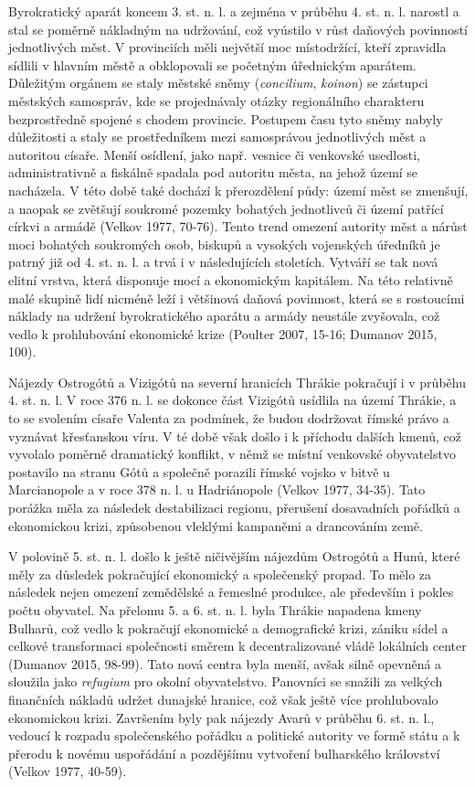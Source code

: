 Byrokratický aparát koncem 3. st. n. l. a zejména v průběhu 4. st. n. l. narostl a stal se poměrně nákladným na udržování, což vyústilo v růst daňových povinností jednotlivých měst. V provinciích měli největší moc místodržící, kteří zpravidla sídlili v hlavním městě a obklopovali se početným úřednickým aparátem. Důležitým orgánem se staly městské sněmy ({\em concilium}, {\em koinon}) se zástupci městských samospráv, kde se projednávaly otázky regionálního charakteru bezprostředně spojené s chodem provincie. Postupem času tyto sněmy nabyly důležitosti a staly se prostředníkem mezi samosprávou jednotlivých měst a autoritou císaře. Menší osídlení, jako např. vesnice či venkovské usedlosti, administrativně a fiskálně spadala pod autoritu města, na jehož území se nacházela. V této době také dochází k přerozdělení půdy: území měst se zmenšují, a naopak se zvětšují soukromé pozemky bohatých jednotlivců či území patřící církvi a armádě (Velkov 1977, 70-76). Tento trend omezení autority měst a nárůst moci bohatých soukromých osob, biskupů a vysokých vojenských úředníků je patrný již od 4. st. n. l. a trvá i v následujících stoletích. Vytváří se tak nová elitní vrstva, která disponuje mocí a ekonomickým kapitálem. Na této relativně malé skupině lidí nicméně leží i většinová daňová povinnost, která se s rostoucími náklady na udržení byrokratického aparátu a armády neustále zvyšovala, což vedlo k prohlubování ekonomické krize (Poulter 2007, 15-16; Dumanov 2015, 100).

Nájezdy Ostrogótů a Vizigótů na severní hranicích Thrákie pokračují i v průběhu 4. st. n. l. V roce 376 n. l. se dokonce část Vizigótů usídlila na území Thrákie, a to se svolením císaře Valenta za podmínek, že budou dodržovat římské právo a vyznávat křesťanskou víru. V té době však došlo i k příchodu dalších kmenů, což vyvolalo poměrně dramatický konflikt, v němž se místní venkovské obyvatelstvo postavilo na stranu Gótů a společně porazili římské vojsko v bitvě u Marcianopole a v roce 378 n. l. u Hadriánopole (Velkov 1977, 34-35). Tato porážka měla za následek destabilizaci regionu, přerušení dosavadních pořádků a ekonomickou krizi, způsobenou vleklými kampaněmi a drancováním země.

V polovině 5. st. n. l. došlo k ještě ničivějším nájezdům Ostrogótů a Hunů, které měly za důsledek pokračující ekonomický a společenský propad. To mělo za následek nejen omezení zemědělské a řemeslné produkce, ale především i pokles počtu obyvatel. Na přelomu 5. a 6. st. n. l. byla Thrákie napadena kmeny Bulharů, což vedlo k pokračují ekonomické a demografické krizi, zániku sídel a celkové transformaci společnosti směrem k decentralizované vládě lokálních center (Dumanov 2015, 98-99). Tato nová centra byla menší, avšak silně opevněná a sloužila jako {\em refugium} pro okolní obyvatelstvo. Panovníci se snažili za velkých finančních nákladů udržet dunajské hranice, což však ještě více prohlubovalo ekonomickou krizi. Završením byly pak nájezdy Avarů v průběhu 6. st. n. l., vedoucí k rozpadu společenského pořádku a politické autority ve formě státu a k přerodu k novému uspořádání a pozdějšímu vytvoření bulharského království (Velkov 1977, 40-59).

